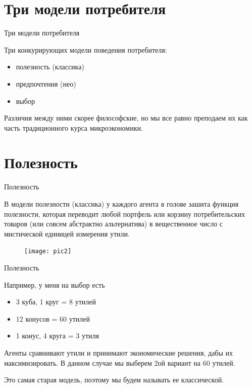 \documentclass{beamer}
\begin{document}
\section{Три модели потребителя}

\begin{frame}{Три модели потребителя}

Три конкурирующих модели поведения потребителя:

\begin{itemize}
\item полезность (классика)
\item предпочтения (нео)
\item выбор
\end{itemize}

Различия между ними скорее философские, но мы все равно преподаем их как часть традиционного курса микроэкономики.

\end{frame}

\section{Полезность}

\begin{frame}{Полезность}

В модели полезности (классика) у каждого агента в голове зашита функция полезности, которая переводит любой \alert{портфель} или \alert{корзину}  потребительских товаров (или совсем абстрактно \alert{альтернатива}) в вещественное число с мистической единицей измерения \alert{утили}.

\end{frame}

\begin{figure}[hbt]
\centering
\texttt{[image: pic2]}
\end{figure}

\begin{frame}{Полезность}

Например, у меня на выбор есть

\begin{itemize}
\item 3 куба, 1 круг = 8 утилей
\item 12 конусов = 60 утилей
\item 1 конус, 4 круга = 3 утиля
\end{itemize}

Агенты сравнивают утили и принимают экономические решения, дабы их максимизировать. В данном случае мы выберем 2ой вариант на 60 утилей.

Это самая старая модель, поэтому мы будем называть ее \alert{классической}.

\end{frame}
\end{document}
